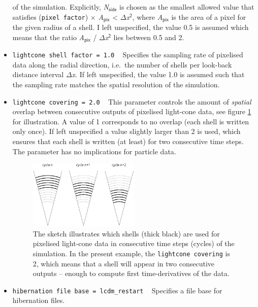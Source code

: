 \documentclass[a4paper,10pt]{article}
\begin{document}
\begin{itemize}
 of the simulation. Explicitly, \textit{N}$_\mathsf{side}$ is chosen as the smallest allowed value that satisfies (\texttt{pixel factor}) $\times$
 \textit{A}$_\mathsf{pix}$ < $\mathsf{\Delta}$\textit{x}$^\mathsf{2}$, where \textit{A}$_\mathsf{pix}$ is the area of a pixel for the given radius of a shell.
 I left unspecified, the value 0.5 is assumed which means that the ratio \textit{A}$_\mathsf{pix}$ / $\mathsf{\Delta}$\textit{x}$^\mathsf{2}$ lies between
 0.5 and 2.
 \item[] \hspace{-25pt}\texttt{lightcone shell factor = 1.0} ~ Specifies the sampling rate of pixelised data along the radial direction, i.e.\ the number of
 shells per look-back distance interval $\mathsf{\Delta}$\textit{x}. If left unspecified, the value 1.0 is assumed such that the sampling rate matches the spatial resolution of the simulation.
 \item[] \hspace{-25pt}\texttt{lightcone covering = 2.0} ~ This parameter controls the amount of \textit{spatial} overlap between consecutive outputs of pixelised
 light-cone data, see figure \ref{fig:covering} for illustration. A value of 1 corresponds to no overlap (each shell is written only once). If left unspecified
 a value slightly larger than 2 is used, which ensures that each shell is written (at least) for two consecutive time steps. The parameter has no implications for
 particle data.
 \begin{figure}
\label{fig:covering}
 \includegraphics[width=0.5\textwidth]{covering2.pdf}
 \caption{\small The sketch illustrates which shells (thick black) are used for pixelised light-cone data in consecutive time steps (cycles) of the simulation. In the
 present example, the \texttt{lightcone covering} is 2, which means that a shell will appear in two consecutive outputs -- enough to compute first time-derivatives
 of the data.}
\end{figure}
 \item[] \hspace{-25pt}\texttt{hibernation file base = lcdm\_restart} ~ Specifies a file base for hibernation files.

\end{itemize}
\end{document}

